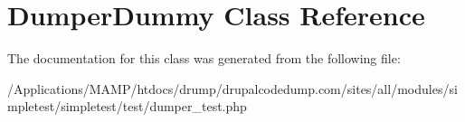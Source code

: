 \hypertarget{class_dumper_dummy}{
\section{DumperDummy Class Reference}
\label{class_dumper_dummy}
}


The documentation for this class was generated from the following file:\begin{DoxyCompactItemize}
\item 
/Applications/MAMP/htdocs/drump/drupalcodedump.com/sites/all/modules/simpletest/simpletest/test/dumper\_\-test.php\end{DoxyCompactItemize}
